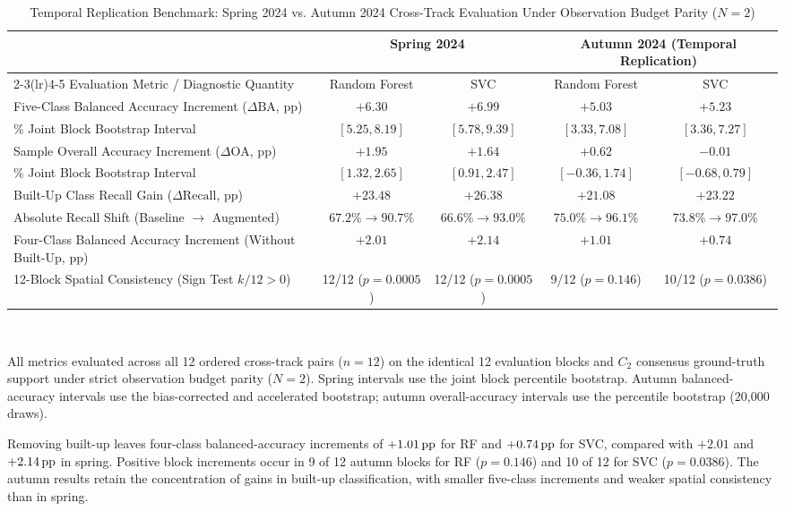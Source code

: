 \begin{table}[!t]
\caption{Temporal Replication Benchmark: Spring 2024 vs. Autumn 2024 Cross-Track Evaluation Under Observation Budget Parity ($N=2$)}
\label{tab:temporal_validation}
\centering
\scriptsize
\setlength{\tabcolsep}{6pt}
\begin{tabular}{lcccc}
\toprule
& \multicolumn{2}{c}{Spring 2024} & \multicolumn{2}{c}{Autumn 2024 (Temporal Replication)} \\
\cmidrule(lr){2-3}\cmidrule(lr){4-5}
Evaluation Metric / Diagnostic Quantity & Random Forest & SVC & Random Forest & SVC \\
\midrule
Five-Class Balanced Accuracy Increment ($\Delta\text{BA}$, pp) & $+6.30$ & $+6.99$ & $+5.03$ & $+5.23$ \\
\quad 95\% Joint Block Bootstrap Interval                      & $[5.25, 8.19]$ & $[5.78, 9.39]$ & $[3.33, 7.08]$ & $[3.36, 7.27]$ \\
Sample Overall Accuracy Increment ($\Delta\text{OA}$, pp)& $+1.95$ & $+1.64$ & $+0.62$ & $-0.01$ \\
\quad 95\% Joint Block Bootstrap Interval                      & $[1.32, 2.65]$ & $[0.91, 2.47]$ & $[-0.36, 1.74]$ & $[-0.68, 0.79]$ \\
Built-Up Class Recall Gain ($\Delta\text{Recall}$, pp)           & $+23.48$ & $+26.38$ & $+21.08$ & $+23.22$ \\
\quad Absolute Recall Shift (Baseline $\to$ Augmented)         & $67.2\% \to 90.7\%$ & $66.6\% \to 93.0\%$ & $75.0\% \to 96.1\%$ & $73.8\% \to 97.0\%$ \\
Four-Class Balanced Accuracy Increment (Without Built-Up, pp)             & $+2.01$ & $+2.14$ & $+1.01$ & $+0.74$ \\
12-Block Spatial Consistency (Sign Test $k/12 > 0$)             & 12/12 ($p = 0.0005$) & 12/12 ($p = 0.0005$) & 9/12 ($p = 0.146$) & 10/12 ($p = 0.0386$) \\
\bottomrule
\end{tabular}
\\[2pt]
\parbox{\textwidth}{\footnotesize All metrics evaluated across all 12 ordered cross-track pairs ($n=12$) on the identical 12 evaluation blocks and $C_2$ consensus ground-truth support under strict observation budget parity ($N=2$). Spring intervals use the joint block percentile bootstrap. Autumn balanced-accuracy intervals use the bias-corrected and accelerated bootstrap; autumn overall-accuracy intervals use the percentile bootstrap (20{,}000 draws).}
\end{table}

Removing built-up leaves four-class balanced-accuracy increments of $+1.01\,\mathrm{pp}$ for RF and $+0.74\,\mathrm{pp}$ for SVC, compared with $+2.01$ and $+2.14\,\mathrm{pp}$ in spring. Positive block increments occur in 9 of 12 autumn blocks for RF ($p=0.146$) and 10 of 12 for SVC ($p=0.0386$). The autumn results retain the concentration of gains in built-up classification, with smaller five-class increments and weaker spatial consistency than in spring.
